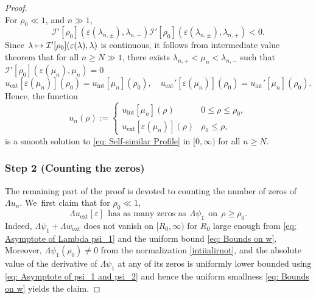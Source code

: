 \documentclass[JEP,XML,SOM,Unicode]{cedram}
\newcommand\mto{\mathchoice{\longmapsto}{\mapsto}{\mapsto}{\mapsto}}
\theoremstyle{plain}
\theoremstyle{definition}
\DeclareMathOperator{\exterior}{ext}
\DeclareMathOperator{\interior}{int}
\begin{document}
\begin{proof}
\[\]
For $\rho_0\ll 1$, and $n\gg 1$,
\[
\mathcal I'[\rho_0](\varepsilon(\lambda_{n,\pm}),\lambda_{n,-})\mathcal I'[\rho_0](\varepsilon(\lambda_{n,\pm}),\lambda_{n,+})<0.
\]
Since $\lambda\mto \mathcal I'[\rho_0](\varepsilon(\lambda),\lambda)$ is continuous, it follows from intermediate value theorem that for all $n\ge N\gg1$, there exists $\lambda_{n,+}<\mu_n<\lambda_{n,-}$ such that $\mathcal I'[\rho_0](\varepsilon(\mu_n),\mu_n)=0$ \ie
\[
u_{\exterior}[\varepsilon (\mu_n)](\rho_0)=u_{\interior}[\mu_n](\rho_0),\quad u_{\exterior}'[\varepsilon (\mu_n)](\rho_0)=u_{\interior}'[\mu_n](\rho_0).
\]
Hence, the function
\[
u_n(\rho):=\begin{cases}
u_{\interior}[\mu_n](\rho) & 0\le \rho\le \rho_0,\\
u_{\exterior}[\varepsilon(\mu_n)](\rho) & \rho_0\le \rho,
\end{cases}
\]
is a smooth solution to \eqref{eq: Self-similar Profile} in $[0,\infty)$ for all $n\ge N$.

\subsubsection*{Step 2 (Counting the zeros)}
The remaining part of the proof is devoted to counting the number of zeros of $\Lambda u_n$. We~first claim that for $\rho_0\ll1$,
\begin{equation}
\label{cenjnenoeo}
\Lambda u_{\exterior}[\varepsilon]\ \ \mbox{has as many zeros as}\ \ \Lambda\psi_1 \ \ \mbox{on}\ \ \rho\geq \rho_0.
\end{equation}
Indeed, $\Lambda \psi_1+\Lambda w_{\exterior}$ does not vanish on $[R_0,\infty)$ for $R_0$ large enough from \eqref{eq: Asymptote of Lambda psi_1} and the uniform bound \eqref{eq: Bounds on w}. Moreover, $\Lambda\psi_1(\rho_0)\neq 0$ from the normalization \eqref{intiialirnot}, and the absolute value of the derivative of $\Lambda\psi_1$ at any of its zeros is uniformly lower bounded using \eqref{eq: Asymptote of psi_1 and psi_2} and hence the uniform smallness \eqref{eq: Bounds on w} yields the claim.


\end{proof}
\end{document}
